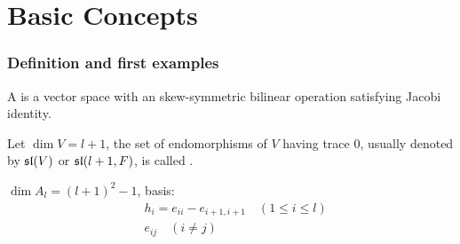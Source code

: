 \part{Basic Concepts}
\section{Definition and first examples}
\begin{defn}
  A  is a vector space with an skew-symmetric bilinear operation satisfying Jacobi identity.
\end{defn}

\begin{exam}[$A_l$]
  Let $\dim V=l+1$, the set of endomorphisms of $V$ having trace $0$, usually denoted by $\sl(V)$ or $\sl(l+1,F)$, is called .

  $\dim A_l=(l+1)^2-1$, basis:
  \begin{align*}
    & h_i=e_{ii}-e_{i+1,i+1} \quad (1\leqslant i\leqslant l) \\
    & e_{ij} \quad (i\neq j)
  \end{align*}
\end{exam}

